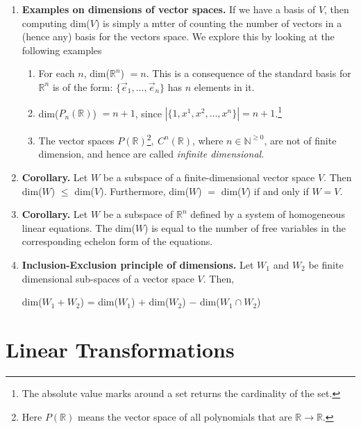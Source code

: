 \documentclass[oneside, 12pt]{book}
\newcommand{\settag}[1]{\renewcommand{\theenumi}{#1}}
\newcommand{\R}{\mathbb{R}}
\newcommand{\tbf}[1]{\textbf{#1}}
\newcommand{\tit}[1]{\textit{#1}}
\begin{document}
\begin{enumerate}
        \settag{1.6.13}
        \item \tbf{Examples on dimensions of vector spaces. }If we have a basis of $V$, then computing dim($V$) is simply a mtter of counting the number of vectors in a (hence any) basis for the vectors space. We explore this by looking at the following examples
        \begin{enumerate}
            \item For each $n$, dim($\R^n$) $=n$. This is a consequence of the standard basis for $\R^n$ is of the form: $\{\vec{e}_1, ..., \vec{e}_n\}$ has $n$ elements in it.
            \item dim($P_n(\R)$) $=n+1$, since $|\{1, x^1, x^2, ..., x^n\}|=n+1$.\footnote{The absolute value marks around a set returns the cardinality of the set.}
            \item The vector spaces $P(\R)$\footnote{Here $P(\R)$ means the vector space of all polynomials that are $\R \xrightarrow{} \R$.}$,~C^n(\R)$, where $n\in \mathbb{N}^{\geq 0}$, are not of finite dimension, and hence are called \tit{infinite dimensional}.
        \end{enumerate}
        
        \settag{1.6.14}
        \item \tbf{Corollary. }Let $W$ be a subspace of a finite-dimensional vector space $V$. Then dim($W$) $\leq$ dim($V$). Furthermore, dim($W$) $=$ dim($V$) if and only if $W=V$.
        
        \settag{1.6.15}
        \item \tbf{Corollary. }Let $W$ be a subspace of $\R^n$ defined by a system of homogeneous linear equations. The dim($W$) is equal to the number of free variables in the corresponding echelon form of the equations.
        
        \settag{1.6.18}
        \item \tbf{Inclusion-Exclusion principle of dimensions.} Let $W_1$ and $W_2$ be finite dimensional sub-spaces of a vector space $V$. Then,
        \begin{center}
            dim($W_1+W_2$) = dim($W_1$) $+$ dim($W_2$) $-$ dim($W_1\cap W_2$)
        \end{center}
        
    \end{enumerate}
    
\chapter{Linear Transformations}
\end{document}
